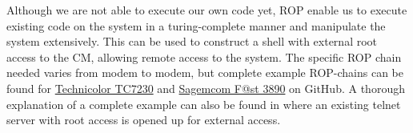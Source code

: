 Although we are not able to execute our own code yet, ROP enable us to execute existing code on the system in a turing-complete manner and manipulate the system extensively.
This can be used to construct a shell with external root access to the CM, allowing remote access to the system.
The specific ROP chain needed varies from modem to modem, but complete example ROP-chains can be found for \href{https://github.com/Lyrebirds/technicolor-tc7230-exploit}{Technicolor TC7230} and \href{https://github.com/Lyrebirds/sagemcom-fast-3890-exploit}{Sagemcom F@st 3890} on GitHub. A thorough explanation of a complete example can also be found in  where an existing telnet server with root access is opened up for external access.

